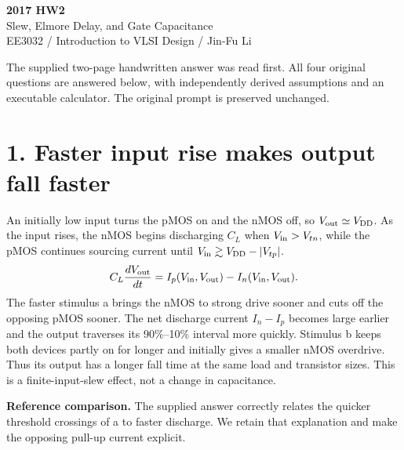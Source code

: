\documentclass[11pt,a4paper]{article}
\newcommand{\VDD}{V_{\mathrm{DD}}}
\begin{document}
\begin{center}{\LARGE\bfseries 2017 HW2}\\[4pt]{\large Slew, Elmore Delay, and Gate Capacitance}\\[4pt]{\small EE3032 / Introduction to VLSI Design / Jin-Fu Li}\end{center}
The supplied two-page handwritten answer was read first. All four original questions are answered below, with independently derived assumptions and an executable calculator. The original prompt is preserved unchanged.
\section*{1. Faster input rise makes output fall faster}
An initially low input turns the pMOS on and the nMOS off, so $V_{\rm out}\simeq\VDD$. As the input rises, the nMOS begins discharging $C_L$ when $V_{\rm in}>V_{tn}$, while the pMOS continues sourcing current until $V_{\rm in}\gtrsim\VDD-|V_{tp}|$.
\[
 C_L\frac{dV_{\rm out}}{dt}=I_p(V_{\rm in},V_{\rm out})-I_n(V_{\rm in},V_{\rm out}).
\]
The faster stimulus a brings the nMOS to strong drive sooner and cuts off the opposing pMOS sooner. The net discharge current $I_n-I_p$ becomes large earlier and the output traverses its 90\%--10\% interval more quickly. Stimulus b keeps both devices partly on for longer and initially gives a smaller nMOS overdrive. Thus its output has a longer fall time at the same load and transistor sizes. This is a finite-input-slew effect, not a change in capacitance.
\begin{center}\end{center}
\textbf{Reference comparison.} The supplied answer correctly relates the quicker threshold crossings of a to faster discharge. We retain that explanation and make the opposing pull-up current explicit.
\end{document}
